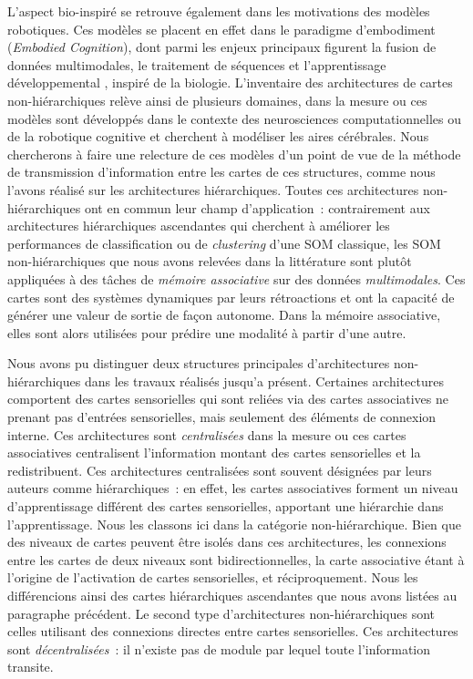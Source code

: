 \documentclass[../main]{subfiles}
\begin{document}
L'aspect bio-inspiré se retrouve également dans les motivations des modèles robotiques. Ces modèles se placent en effet dans le paradigme d'embodiment (\emph{Embodied Cognition}), dont parmi les enjeux principaux figurent la fusion de données multimodales, le traitement de séquences et l'apprentissage développemental \cite{Smith2005TheDO}, inspiré de la biologie. 
L'inventaire des architectures de cartes non-hiérarchiques relève ainsi de plusieurs domaines, dans la mesure ou ces modèles sont développés dans le contexte des neurosciences computationnelles ou de la robotique cognitive et cherchent à modéliser les aires cérébrales. 
Nous chercherons à faire une relecture de ces modèles d'un point de vue de la méthode de transmission d'information entre les cartes de ces structures, comme nous l'avons réalisé sur les architectures hiérarchiques.
Toutes ces architectures non-hiérarchiques ont en commun leur champ d'application~: contrairement aux architectures hiérarchiques ascendantes qui cherchent à améliorer les performances de classification ou de \emph{clustering} d'une SOM classique, les SOM non-hiérarchiques que nous avons relevées dans la littérature sont plutôt appliquées à des tâches de \emph{mémoire associative} sur des données \emph{multimodales}.
Ces cartes sont des systèmes dynamiques par leurs rétroactions et ont la capacité de générer une valeur de sortie de façon autonome. Dans la mémoire associative, elles sont alors utilisées pour prédire une modalité à partir d'une autre.


Nous avons pu distinguer deux structures principales d'architectures non-hiérarchiques dans les travaux réalisés jusqu'a présent.
Certaines architectures comportent des cartes sensorielles qui sont reliées via des cartes associatives ne prenant pas d'entrées sensorielles, mais seulement des éléments de connexion interne. 
Ces architectures sont \emph{centralisées} dans la mesure ou ces cartes associatives centralisent l'information  montant des cartes sensorielles et la redistribuent. Ces architectures centralisées sont souvent désignées par leurs auteurs comme hiérarchiques~: en effet, les cartes associatives forment un niveau d'apprentissage différent des cartes sensorielles, apportant une hiérarchie dans l'apprentissage. Nous les classons ici dans la catégorie non-hiérarchique. Bien que des niveaux de cartes peuvent être isolés dans ces architectures, les connexions entre les cartes de deux niveaux sont bidirectionnelles, la carte associative étant à l'origine de l'activation de cartes sensorielles, et réciproquement.
Nous les différencions ainsi des cartes hiérarchiques ascendantes que nous avons listées au paragraphe précédent.
Le second type d'architectures non-hiérarchiques sont celles utilisant des connexions directes entre cartes sensorielles. Ces architectures sont \emph{décentralisées}~: il n'existe pas de module par lequel toute l'information transite.
\end{document}

